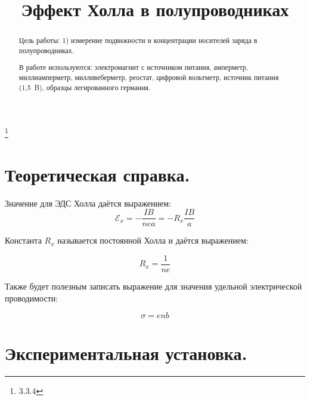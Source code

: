 


\title{Эффект Холла в полупроводниках}
\thanks{3.3.4}



\begin{abstract}
Цель работы: 1) измерение подвижности и концентрации носителей заряда в полупроводниках.

В работе используются: электромагнит с источником питания, амперметр, миллиамперметр, милливеберметр, реостат, цифровой вольтметр, источник питания (1,5~B), образцы легированного германия.

\end{abstract}

\maketitle


\section{\label{sec:level1}Теоретическая справка.}

Значение для ЭДС Холла даётся выражением: 
\\

\begin{equation}\label{1}
    {\mathscr{E}}_x = - \frac{IB}{nea} = - R_x \frac{IB}{a}
\end{equation}

Константа $R_x$ называется постоянной Холла и даётся выражением:

\begin{equation}\label{2}
    R_x = \frac{1}{ne}
\end{equation}

Также будет полезным записать выражение для значения удельной электрической проводимости:

\begin{equation}\label{3}
    \sigma = enb
\end{equation}

\section{\label{sec:level1}Экспериментальная установка.}


